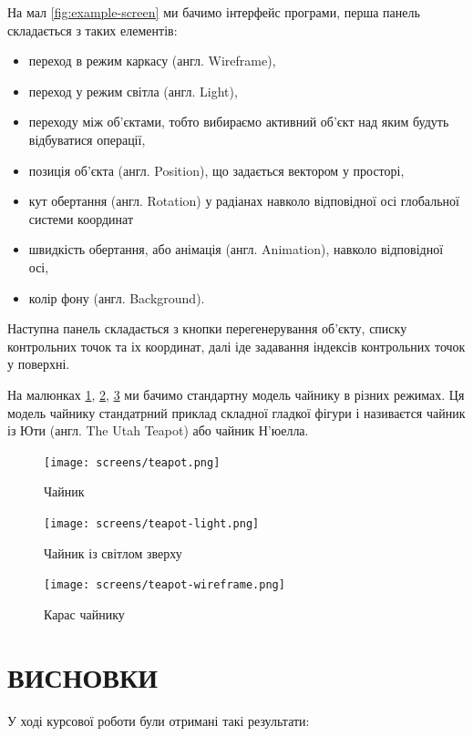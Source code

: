 \documentclass[14pt,a4paper]{extarticle}
\theoremstyle{definition}
\renewcommand{\[}{\begin{singlespace}\begin{equation*}}
\renewcommand{\]}{\end{equation*}\end{singlespace}}
\begin{document}
На мал \ref{fig:example-screen} ми бачимо інтерфейс програми, перша панель складається з таких елементів:
\begin{itemize}
\item переход в режим каркасу (англ. Wireframe),
\item переход у режим світла (англ. Light),
\item переходу між об'єктами, тобто вибираємо активний об'єкт над яким будуть відбуватися операції,
\item позиція об'єкта (англ. Position), що задається вектором у просторі,
\item кут обертання (англ. Rotation) у радіанах навколо відповідної осі глобальної системи координат
\item швидкість обертання, або анімація (англ. Animation), навколо відповідної осі,
\item колір фону (англ. Background).
\end{itemize}

Наступна панель складається з кнопки перегенерування об'єкту, списку контрольних точок та іх координат, далі іде задавання індексів контрольних точок у поверхні.

На малюнках \ref{fig:teapot}, \ref{fig:teapot-light}, \ref{fig:teapot-wireframe} ми бачимо стандартну модель чайнику в різних режимах. Ця модель чайнику стандатрний приклад складної гладкої фігури і називаєтся чайник із Юти (англ. The Utah Teapot) або чайник Н'юелла.

\begin{figure}[!htb]
    \centering
    \texttt{[image: screens/teapot.png]}
    \caption{Чайник}\label{fig:teapot}
\end{figure}

\begin{figure}[!htb]
    \centering
    \texttt{[image: screens/teapot-light.png]}
    \caption{Чайник із світлом зверху}\label{fig:teapot-light}
\end{figure}

\begin{figure}[!htb]
    \centering
    \texttt{[image: screens/teapot-wireframe.png]}
    \caption{Карас чайнику}\label{fig:teapot-wireframe}
\end{figure}

\section*{ВИСНОВКИ}
У ході курсової роботи були отримані такі результати:
\end{document}
